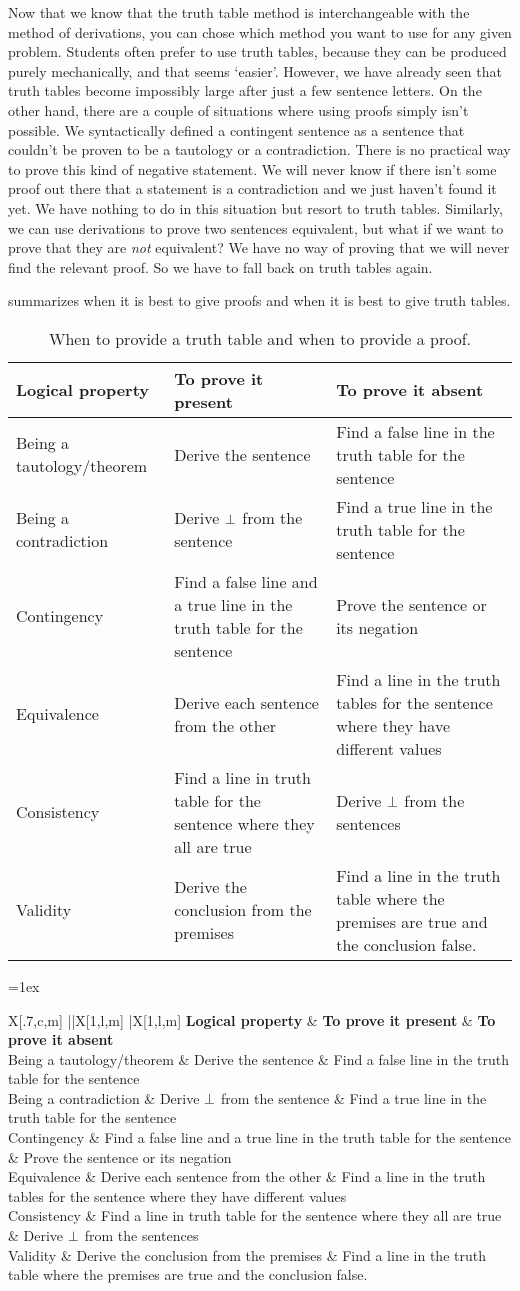 Now that we know that the truth table method is interchangeable with the method of derivations, you can chose which method you want to use for any given problem. Students often prefer to use truth tables, because they can be produced purely mechanically, and that seems `easier'. However, we have already seen that truth tables become impossibly large after just a few sentence letters. On the other hand, there are a couple of situations where using proofs simply isn't possible. We syntactically defined a contingent sentence as a sentence that couldn't be proven to be a tautology or a contradiction. There is no practical way to prove this kind of negative statement. We will never know if there isn't some proof out there that a statement is a contradiction and we just haven't found it yet. We have nothing to do in this situation but resort to truth tables. Similarly, we can use derivations to prove two sentences equivalent, but what if we want to prove that they are \emph{not} equivalent? We have no way of proving that we will never find the relevant proof. So we have to fall back on truth tables again.

 summarizes when it is best to give proofs 
and when it is best to give truth tables.

\def\tmptable{\textbf{Logical property} 	&	\textbf{To prove it present} 	&	\textbf{To prove it absent} \\ \hline \hline
Being a tautology/theorem 		& Derive the sentence  						& Find a false line in the truth table for the sentence \\ \hline
Being a contradiction 	&  Derive $\ered$ from the sentence  		 & Find a true line in the truth table for the sentence\\ \hline
Contingency 			& Find a false line and a true line in the truth table for the sentence & Prove the sentence or its negation\\ \hline
Equivalence 			& Derive each sentence from the other 		 & Find a line in the truth tables for the sentence where they have different values\\ \hline
Consistency 		& Find a line in truth table for the sentence where they all are true & Derive $\ered$ from the sentences\\ \hline
Validity 				& Derive the conclusion from the premises & Find a line in the truth table where the premises are true and the conclusion false. \\ }

\ifHTMLtarget
\begin{table}
\begin{tabularx}{\textwidth}{X||X|X}
\tmptable
\end{tabularx}
\caption{When to provide a truth table and when to provide a proof.}
\label{table.ProofOrModel}
\end{table}
\else
\begin{table}\small
\tabulinesep=1ex
\begin{tabu}{X[.7,c,m] ||X[1,l,m] |X[1,l,m]}
\tmptable
\end{tabu}
\caption{When to provide a truth table and when to provide a proof.}
\label{table.ProofOrModel}
\end{table}
\fi



